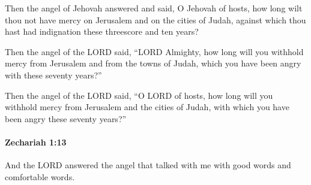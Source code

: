 			\begin{versebox}
					\item[BHS] 
					\item[LXX] 
					\item[ASV] Then the angel of Jehovah answered and said, O Jehovah of hosts, how long wilt thou not have mercy on Jerusalem and on the cities of Judah, against which thou hast had indignation these threescore and ten years?
					\item[NIV] Then the angel of the LORD said, “LORD Almighty, how long will you withhold mercy from Jerusalem and from the towns of Judah, which you have been angry with these seventy years?”
					\item[NRSV] Then the angel of the LORD said, “O LORD of hosts, how long will you withhold mercy from Jerusalem and the cities of Judah, with which you have been angry these seventy years?”
			\end{versebox}

		\paragraph{Zechariah 1:13} %
			\label{ZECHARIAH-1-13}

			And the LORD answered the angel that talked with me with good words and comfortable words.


